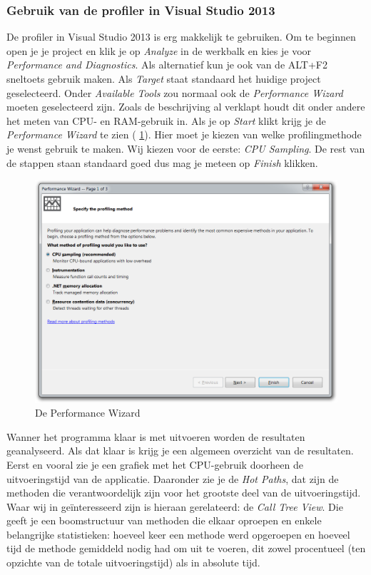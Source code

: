 \subsubsection{Gebruik van de profiler in Visual Studio 2013}

De profiler in Visual Studio 2013 is erg makkelijk te gebruiken.
Om te beginnen open je je project en klik je op \emph{Analyze} in de werkbalk en kies je voor \emph{Performance and Diagnostics}.
Als alternatief kun je ook van de ALT+F2 sneltoets gebruik maken.
Als \emph{Target} staat standaard het huidige project geselecteerd.
Onder \emph{Available Tools} zou normaal ook de \emph{Performance Wizard} moeten geselecteerd zijn.
Zoals de beschrijving al verklapt houdt dit onder andere het meten van CPU- en RAM-gebruik in.
Als je op \emph{Start} klikt krijg je de \emph{Performance Wizard} te zien (\figurenamesentence{} \ref{performance-wizard}).
Hier moet je kiezen van welke profilingmethode je wenst gebruik te maken.
Wij kiezen voor de eerste: \emph{CPU Sampling}.
De rest van de stappen staan standaard goed dus mag je meteen op \emph{Finish} klikken.

\begin{figure}[]
	\centering
	\includegraphics[scale=0.50]{figures/profiler/performance-wizard}
	\caption{De Performance Wizard}
	\label{performance-wizard}
\end{figure}

Wanner het programma klaar is met uitvoeren worden de resultaten geanalyseerd.
Als dat klaar is krijg je een algemeen overzicht van de resultaten. 
Eerst en vooral zie je een grafiek met het CPU-gebruik doorheen de uitvoeringstijd van de applicatie.
Daaronder zie je de \emph{Hot Paths}, dat zijn de methoden die verantwoordelijk zijn voor het grootste deel van de uitvoeringstijd.
Waar wij in geïnteresseerd zijn is hieraan gerelateerd: de \emph{Call Tree View}.
Die geeft je een boomstructuur van methoden die elkaar oproepen en enkele belangrijke statistieken:
hoeveel keer een methode werd opgeroepen en hoeveel tijd de methode gemiddeld nodig had om uit te voeren,
dit zowel procentueel (ten opzichte van de totale uitvoeringstijd) als in absolute tijd.

